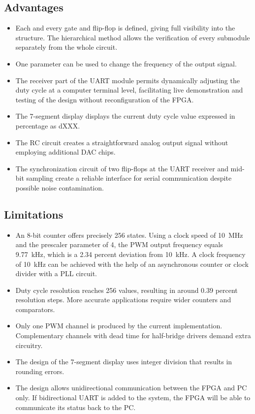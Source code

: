 \documentclass[12pt,a4paper]{article}
\begin{document}
\subsection*{Advantages}
\begin{itemize}
\item Each and every gate and flip-flop is defined, giving full visibility into the structure. The hierarchical method allows the verification of every submodule separately from the whole circuit.

\item One parameter can be used to change the frequency of the output signal.

\item The receiver part of the UART module permits dynamically adjusting the duty cycle at a computer terminal level, facilitating live demonstration and testing of the design without reconfiguration of the FPGA.

\item The 7-segment display displays the current duty cycle value expressed in percentage as dXXX.

\item The RC circuit creates a straightforward analog output signal without employing additional DAC chips.

\item The synchronization circuit of two flip-flops at the UART receiver and mid-bit sampling create a reliable interface for serial communication despite possible noise contamination.
\end{itemize}

\subsection*{Limitations}
\begin{itemize}
\item An 8-bit counter offers precisely 256 states. Using a clock speed of 10~MHz and the prescaler parameter of 4, the PWM output frequency equals 9.77~kHz, which is a 2.34 percent deviation from 10~kHz. A clock frequency of 10~kHz can be achieved with the help of an asynchronous counter or clock divider with a PLL circuit.

\item Duty cycle resolution reaches 256 values, resulting in around 0.39 percent resolution steps. More accurate applications require wider counters and comparators.

\item Only one PWM channel is produced by the current implementation. Complementary channels with dead time for half-bridge drivers demand extra circuitry.

\item The design of the 7-segment display uses integer division that results in rounding errors.

\item The design allows unidirectional communication between the FPGA and PC only. If bidirectional UART is added to the system, the FPGA will be able to communicate its status back to the PC.
\end{itemize}
\end{document}
